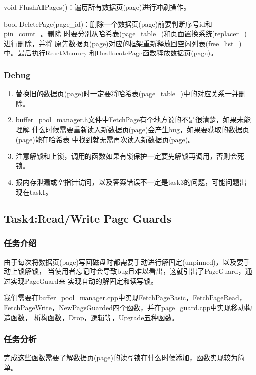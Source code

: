 \documentclass[a4paper]{article}
\begin{document}
void FlushAllPages()：遍历所有数据页(page)进行冲刷操作。

bool DeletePage(page\_id)：删除一个数据页(page)前要判断序号id和pin\_count\_。删除
时要分别从哈希表(page\_table\_)和页面置换系统(replacer\_)进行删除，并将
原先数据页(page)对应的框架重新释放回空闲列表(free\_list\_)中。最后执行ResetMemory
和DeallocatePage函数释放数据页(page)。

\subsubsection{Debug}

\begin{enumerate}
   \item 替换旧的数据页(page)时一定要将哈希表(page\_table\_)中的对应关系一并删除。
   \item buffer\_pool\_manager.h文件中FetchPage有个地方说的不是很清楚，如果未能理解
   什么时候需要重新读入新数据页(page)会产生bug，如果要获取的数据页(page)能在哈希表
   中找到就无需再次读入新数据页(page)。
   \item 注意解锁和上锁，调用的函数如果有锁保护一定要先解锁再调用，否则会死锁。
   \item 报内存泄漏或空指针访问，以及答案错误不一定是task3的问题，可能问题出现在task1。
\end{enumerate}

\subsection{Task4:Read/Write Page Guards}

\subsubsection{任务介绍}

由于每次将数据页(page)写回磁盘时都需要手动进行解固定(unpinned)，以及要手动上锁解锁，
当使用者忘记时会导致bug且难以看出，这就引出了PageGuard，通过实现PageGuard来
实现自动的解固定和读写锁。

我们需要在buffer\_pool\_manager.cpp中实现FetchPageBasic，FetchPageRead，
FetchPageWrite，NewPageGuarded四个函数，并在page\_guard.cpp中实现移动构造函数，
析构函数，Drop，逻辑等，Upgrade五种函数。

\subsubsection{任务分析}

完成这些函数需要了解数据页(page)的读写锁在什么时候添加，函数实现较为简单。
\end{document}
